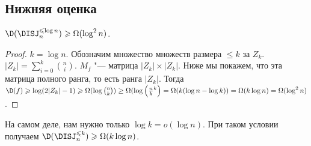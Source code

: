 \subsection{Нижняя оценка}
\begin{theorem}
$\D(\DISJ^{\leqslant \log n}_n)\geqslant \Omega(\log^2 n)$.
\end{theorem}
\begin{proof}
$k = \log n$.
Обозначим множество множеств размера $\leqslant k$ за $Z_k$. $|Z_k| = \sum_{i=0}^k \binom{n}{i}$.
$M_{f}$ "--- матрица $|Z_k|\times |Z_k|$.
Ниже мы покажем, что эта матрица полного ранга, то есть ранга $|Z_k|$. Тогда $\D(f) \geqslant \log(2|Z_k| - 1) \geqslant \Omega(\log \binom{n}{k}) \ge \Omega(\log \left(\frac{n}{k}^k\right) = \Omega(k(\log n - \log k)) = \Omega(k\log n) = \Omega(\log^2 n)$.
\end{proof}

\begin{remark}
На самом деле, нам нужно только $\log k = o(\log n)$. При таком условии получаем $\D(\DISJ^{\leqslant k}_n)\geqslant \Omega(k\log n)$.
\end{remark}

